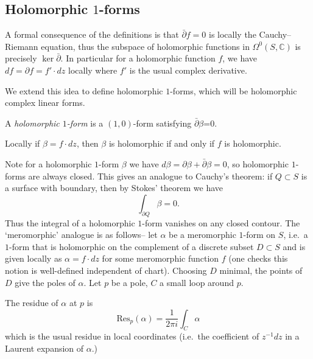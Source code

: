 \subsection{Holomorphic \(1\)-forms} A formal consequence of the definitions is that
\(\bar \partial f=0\) is locally the Cauchy--Riemann equation, thus the subspace
of holomorphic functions in \(\Omega^0(S,\mathbb{C})\) is precisely \(\ker
\bar\partial\).  In particular for a holomorphic function \(f\), we have
\(df=\partial f=f'\cdot dz\) locally where \(f'\) is the usual complex
derivative.

We extend this idea to define holomorphic \(1\)-forms, which will be holomorphic
complex linear forms.

\begin{definition}
    A \textit{holomorphic \(1\)-form} is a \((1,0)\)-form satisfying
    \(\bar\partial \beta\)=0.
\end{definition}

Locally if \(\beta=f\cdot dz\), then \(\beta\) is holomorphic if and only if \(f\) is holomorphic.

Note for a holomorphic \(1\)-form \(\beta\) we have \(d\beta=\partial \beta +
\bar\partial \beta =  0\), so holomorphic \(1\)-forms are always closed.
This gives an analogue to Cauchy's theorem: if \(Q\subset S\) is a surface
with boundary, then by Stokes' theorem we have \[\int_{\partial Q}\beta = 0.\]  Thus the integral of a holomorphic \(1\)-form vanishes on any closed
contour. The `meromorphic' analogue is as follows-- let \(\alpha\) be a
meromorphic \(1\)-form on \(S\), i.e.\ a \(1\)-form that is holomorphic on the
complement of a discrete subset \(D\subset S\) and is given locally as
\(\alpha=f\cdot dz\) for some meromorphic function \(f\) (one checks this notion
is well-defined independent of chart). Choosing \(D\) minimal, the points of
\(D\) give the poles of \(\alpha\). Let \(p\) be a pole, \(C\) a small loop
around \(p\).

\begin{definition}
    The residue of \(\alpha\) at \(p\) is
    \[\text{Res}_p(\alpha)=\frac{1}{2\pi i}\int_C \alpha\]
    which is the usual residue in local coordinates (i.e.\ the coefficient of
    \(z^{-1}dz\) in a Laurent expansion of \(\alpha\).)
\end{definition}

